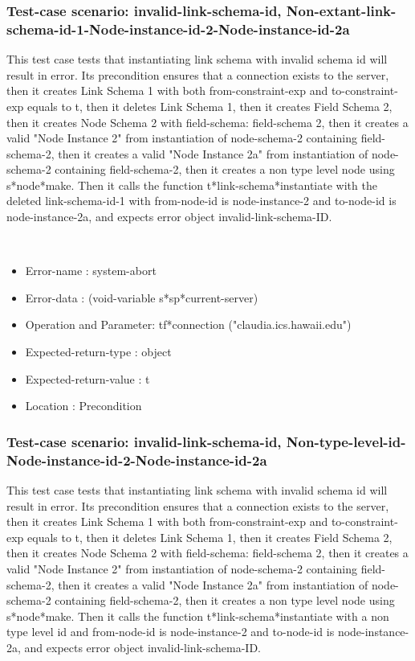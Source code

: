 \subsubsection {Test-case scenario: invalid-link-schema-id, Non-extant-link-schema-id-1-Node-instance-id-2-Node-instance-id-2a}


This test case tests that instantiating link schema with invalid schema id will result in error.
Its precondition ensures that a connection exists to the server, then it creates Link Schema 1 with both from-constraint-exp and to-constraint-exp equals to t, then it deletes Link Schema 1, then it creates Field Schema 2, then it creates Node Schema 2 with field-schema: field-schema 2, then it creates a valid "Node Instance 2" from instantiation of node-schema-2 containing field-schema-2, then it creates a valid "Node Instance 2a" from instantiation of node-schema-2 containing field-schema-2, then it creates a non type level node using s*node*make.
Then it calls the function t*link-schema*instantiate  with the deleted link-schema-id-1 with from-node-id is node-instance-2 and to-node-id is node-instance-2a, and expects error object invalid-link-schema-ID.



\
\begin {itemize}
\item 	Error-name             : system-abort
\item Error-data             : (void-variable s*sp*current-server)
\item Operation and Parameter: tf*connection ("claudia.ics.hawaii.edu")
\item Expected-return-type   : object
\item Expected-return-value  : t
\item Location               : Precondition



\end {itemize}
\subsubsection {Test-case scenario: invalid-link-schema-id, Non-type-level-id-Node-instance-id-2-Node-instance-id-2a}


This test case tests that instantiating link schema with invalid schema id will result in error.
Its precondition ensures that a connection exists to the server, then it creates Link Schema 1 with both from-constraint-exp and to-constraint-exp equals to t, then it deletes Link Schema 1, then it creates Field Schema 2, then it creates Node Schema 2 with field-schema: field-schema 2, then it creates a valid "Node Instance 2" from instantiation of node-schema-2 containing field-schema-2, then it creates a valid "Node Instance 2a" from instantiation of node-schema-2 containing field-schema-2, then it creates a non type level node using s*node*make.
Then it calls the function t*link-schema*instantiate  with a non type level id and  from-node-id is node-instance-2 and to-node-id is node-instance-2a, and expects error object invalid-link-schema-ID.



